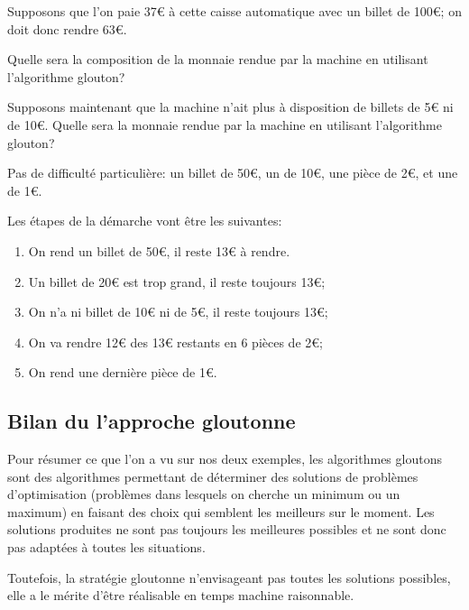 \documentclass[12pt]{article}
\begin{document}
	\begin{MonExo}
		Supposons que l'on paie 37\euro{} à cette caisse automatique avec un billet de 100\euro{}; on doit donc rendre 63\euro{}.
		\begin{alphenum}
			\item Quelle sera la composition de la monnaie rendue par la machine en utilisant l'algorithme glouton?
			\item Supposons maintenant que la machine n'ait plus à disposition de billets de 5\euro{} ni de 10\euro{}. Quelle sera la monnaie rendue par la machine en utilisant l'algorithme glouton?
		\end{alphenum}
	\end{MonExo}
	\begin{MaReponse}
		\begin{alphenum}
			\item Pas de difficulté particulière: un billet de 50\euro{}, un de 10\euro{}, une pièce de 2\euro{}, et une de 1\euro{}.
			\item Les étapes de la démarche vont être les suivantes:
			\begin{enumerate}
				\item On rend un billet de 50\euro{}, il reste 13\euro{} à rendre.
				\item Un billet de 20\euro{} est trop grand, il reste toujours 13\euro{};
				\item On n'a ni billet de 10\euro{} ni de 5\euro{}, il reste toujours 13\euro{};
				\item On va rendre 12\euro{} des 13\euro{} restants en 6 pièces de 2\euro{};
				\item On rend une dernière pièce de 1\euro{}.
			\end{enumerate}
		\end{alphenum}
	\end{MaReponse}
	
	\subsection{Bilan du l'approche gloutonne}
	Pour résumer ce que l'on a vu sur nos deux exemples, les algorithmes gloutons sont des algorithmes permettant de déterminer des solutions de problèmes d’optimisation (problèmes dans lesquels on cherche un minimum ou un maximum) en faisant des choix qui semblent les meilleurs sur le moment. Les solutions produites ne sont pas toujours les meilleures possibles et ne sont donc pas adaptées à toutes les situations.
	
	Toutefois, la stratégie gloutonne n'envisageant pas toutes les solutions possibles, elle a le mérite d’être réalisable en temps machine raisonnable.
\end{document}
